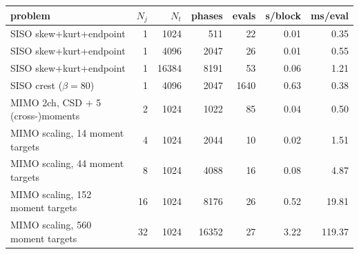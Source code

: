 \begin{tabular}{l r r r r r r}
problem & $N_j$ & $N_t$ & phases & evals & s/block & ms/eval \\
\hline
SISO skew+kurt+endpoint & 1 & 1024 & 511 & 22 & 0.01 & 0.35 \\
SISO skew+kurt+endpoint & 1 & 4096 & 2047 & 26 & 0.01 & 0.55 \\
SISO skew+kurt+endpoint & 1 & 16384 & 8191 & 53 & 0.06 & 1.21 \\
SISO crest ($\beta=80$) & 1 & 4096 & 2047 & 1640 & 0.63 & 0.38 \\
MIMO 2ch, CSD + 5 (cross-)moments & 2 & 1024 & 1022 & 85 & 0.04 & 0.50 \\
MIMO scaling, 14 moment targets & 4 & 1024 & 2044 & 10 & 0.02 & 1.51 \\
MIMO scaling, 44 moment targets & 8 & 1024 & 4088 & 16 & 0.08 & 4.87 \\
MIMO scaling, 152 moment targets & 16 & 1024 & 8176 & 26 & 0.52 & 19.81 \\
MIMO scaling, 560 moment targets & 32 & 1024 & 16352 & 27 & 3.22 & 119.37 \\
\end{tabular}
